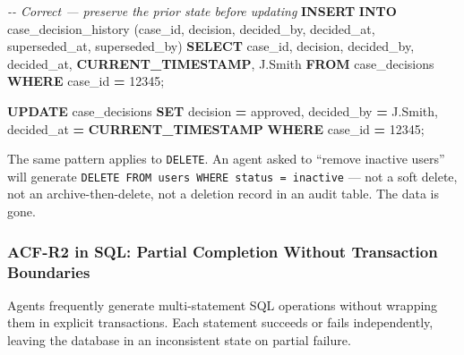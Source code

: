 \documentclass[a4paper,11pt]{report}
\newenvironment{Shaded}{\begin{snugshade}}{\end{snugshade}}
\newcommand{\CommentTok}[1]{\textcolor[rgb]{0.56,0.35,0.01}{\textit{#1}}}
\newcommand{\DecValTok}[1]{\textcolor[rgb]{0.00,0.00,0.81}{#1}}
\newcommand{\FunctionTok}[1]{\textcolor[rgb]{0.13,0.29,0.53}{\textbf{#1}}}
\newcommand{\KeywordTok}[1]{\textcolor[rgb]{0.13,0.29,0.53}{\textbf{#1}}}
\newcommand{\NormalTok}[1]{#1}
\newcommand{\OperatorTok}[1]{\textcolor[rgb]{0.81,0.36,0.00}{\textbf{#1}}}
\newcommand{\StringTok}[1]{\textcolor[rgb]{0.31,0.60,0.02}{#1}}
\begin{document}
\begin{Shaded}
\begin{Highlighting}[]
\CommentTok{{-}{-} Correct — preserve the prior state before updating}
\KeywordTok{INSERT} \KeywordTok{INTO}\NormalTok{ case\_decision\_history}
\NormalTok{    (case\_id, decision, decided\_by, decided\_at, superseded\_at, superseded\_by)}
\KeywordTok{SELECT}
\NormalTok{    case\_id, decision, decided\_by, decided\_at, }\FunctionTok{CURRENT\_TIMESTAMP}\NormalTok{, }\StringTok{\textquotesingle{}J.Smith\textquotesingle{}}
\KeywordTok{FROM}\NormalTok{ case\_decisions}
\KeywordTok{WHERE}\NormalTok{ case\_id }\OperatorTok{=} \DecValTok{12345}\NormalTok{;}

\KeywordTok{UPDATE}\NormalTok{ case\_decisions}
\KeywordTok{SET}\NormalTok{ decision }\OperatorTok{=} \StringTok{\textquotesingle{}approved\textquotesingle{}}\NormalTok{, decided\_by }\OperatorTok{=} \StringTok{\textquotesingle{}J.Smith\textquotesingle{}}\NormalTok{, decided\_at }\OperatorTok{=} \FunctionTok{CURRENT\_TIMESTAMP}
\KeywordTok{WHERE}\NormalTok{ case\_id }\OperatorTok{=} \DecValTok{12345}\NormalTok{;}
\end{Highlighting}
\end{Shaded}

The same pattern applies to \texttt{DELETE}. An agent asked to ``remove
inactive users'' will generate
\texttt{DELETE\ FROM\ users\ WHERE\ status\ =\ \textquotesingle{}inactive\textquotesingle{}}
--- not a soft delete, not an archive-then-delete, not a deletion record
in an audit table. The data is gone.

\hypertarget{acf-r2-in-sql-partial-completion-without-transaction-boundaries}{%
\subsubsection{ACF-R2 in SQL: Partial Completion Without Transaction
Boundaries}\label{acf-r2-in-sql-partial-completion-without-transaction-boundaries}}

Agents frequently generate multi-statement SQL operations without
wrapping them in explicit transactions. Each statement succeeds or fails
independently, leaving the database in an inconsistent state on partial
failure.
\end{document}
